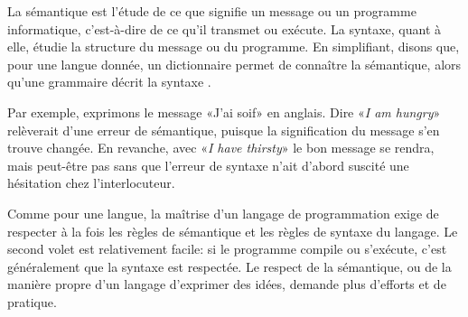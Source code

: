 La sémantique est l'étude de ce que signifie un message ou un
programme informatique, c'est-à-dire de ce qu'il transmet ou exécute.
La syntaxe, quant à elle, étudie la structure du message ou du
programme. En simplifiant, disons que, pour une langue donnée, un
dictionnaire permet de connaître la sémantique, alors qu'une grammaire
décrit la syntaxe \citep{Hebenstreit:semantique}.

Par exemple, exprimons le message «J'ai soif» en anglais. Dire
«\emph{I am hungry}» relèverait d'une erreur de sémantique, puisque la
signification du message s'en trouve changée. En revanche, avec
«\emph{I have thirsty}» le bon message se rendra, mais peut-être pas
sans que l'erreur de syntaxe n'ait d'abord suscité une hésitation chez
l'interlocuteur.

Comme pour une langue, la maîtrise d'un langage de programmation exige
de respecter à la fois les règles de sémantique et les règles de
syntaxe du langage. Le second volet est relativement facile: si le
programme compile ou s'exécute, c'est généralement que la syntaxe est
respectée. Le respect de la sémantique, ou de la manière propre d'un
langage d'exprimer des idées, demande plus d'efforts et de pratique.





